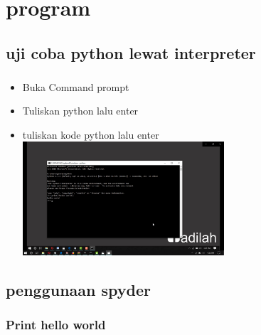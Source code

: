 \documentclass[a4paper,12pt]{report}
\begin{document}
\chapter{program}
\section{uji coba python lewat interpreter}
\paragraph{}
\begin{itemize}
	\item Buka Command prompt
	\item Tuliskan python lalu enter
	\item tuliskan kode python lalu enter\\
	\includegraphics[width=7.5cm]{gambar/entrepreter/Screenshot (80).png} 
	
\end{itemize}

\section{penggunaan spyder}
\subsection{Print hello world}
\end{document}
